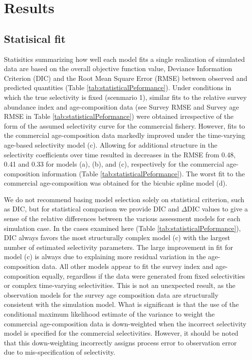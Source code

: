 


\section*{Results} %
\label{sec:results}

\subsection*{Statisical fit} %
\label{sub:statisical_fit}

Statisitics summarizing how well each model fits a single realization of simulated data are based on the overall objective function value, Deviance Information Criterion (DIC) and the Root Mean Square Error (RMSE) between observed and predicted quantities (Table \ref{tab:statisticalPeformance}). Under conditions in which the true selectivity is fixed (scenmario 1), similar fits to the relative survey abundance index and age-composition data (see Survey RMSE and Survey age RMSE in Table \ref{tab:statisticalPeformance}) were obtained  irrespective of the form of the assumed selectivity curve for the commercial fishery.  However, fits to the commercial age-composition data markedly improved under the time-varying age-based selectivity model (c).  Allowing for additional structure in the selectivity coefficients over time resulted in decreases in the RMSE from 0.48, 0.41 and 0.33 for models (a), (b), and (c), respectively for the commercial age-composition information (Table \ref{tab:statisticalPeformance}).  The worst fit to the commercial age-composition was obtained for the bicubic spline model (d).

We do not recommend basing model selection solely on statistical criterion, such as DIC, but for statistical comparison we provide DIC and $\Delta$DIC values to give a sense of the relative differences between the various assessment models for each simulation case.  In the cases examined here (Table \ref{tab:statisticalPeformance}), DIC always favors the most structurally complex model (c) with the largest number of estimated selectivity parameters. The large improvement in fit for model (c) is always due to explaining more residual variation in the age-composition data. All other models appear to fit the survey index and age-composition equally, regardless if the data were generated from fixed selectivities or complex time-varying selectivities.  This is not an unexpected result, as the observation models for the survey age composition data are structurally consistent with the simulation model.  What is significant is that the use of the conditional maximum likelihood estimate of the variance to weight the commercial age-composition data is down-weighted when the incorrect selectivity model is specified for the commercial selectivities. However, it should be noted that this down-weighting incorrectly assigns process error to observation error due to mis-specification of selectivity.




